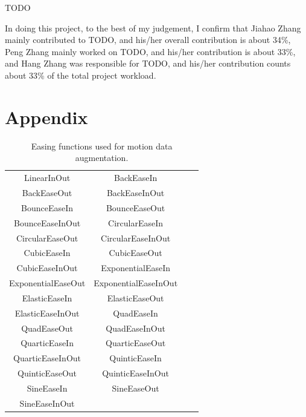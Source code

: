 \documentclass[final]{cvpr}
\begin{document}
TODO

In doing this project, to the best of my judgement,
I confirm that Jiahao Zhang mainly contributed to TODO,
and his/her overall contribution is about 34\%,
Peng Zhang mainly worked on TODO,
and his/her contribution is about 33\%,
and Hang Zhang was responsible for TODO,
and his/her contribution counts about 33\% of the total project workload.

\appendix

\section{Appendix}

\begin{table}[htb]
    \centering
    \caption{Easing functions used for motion data augmentation.}
    \label{easingFunctions}
    \begin{tabular}{cccc}
        \toprule
        LinearInOut      & BackEaseIn        \\ BackEaseOut        & BackEaseInOut        \\
        BounceEaseIn     & BounceEaseOut     \\ BounceEaseInOut    & CircularEaseIn       \\
        CircularEaseOut  & CircularEaseInOut \\ CubicEaseIn        & CubicEaseOut         \\
        CubicEaseInOut   & ExponentialEaseIn \\ ExponentialEaseOut & ExponentialEaseInOut \\
        ElasticEaseIn    & ElasticEaseOut    \\ ElasticEaseInOut   & QuadEaseIn           \\
        QuadEaseOut      & QuadEaseInOut     \\ QuarticEaseIn      & QuarticEaseOut       \\
        QuarticEaseInOut & QuinticEaseIn     \\ QuinticEaseOut     & QuinticEaseInOut     \\
        SineEaseIn       & SineEaseOut       \\ SineEaseInOut \\
        \bottomrule
    \end{tabular}
\end{table}
\end{document}
